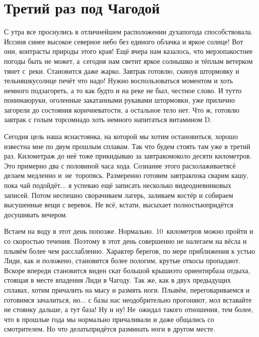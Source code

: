 \chapter{Третий раз под Чагодой} 
\vepsianrose

С утра все проснулись в отличнейшем расположении духа\mdash погода способствовала. Иссиня синее высокое северное небо без единого облачка и яркое солнце! Вот они, контрасты природы этого края! Ещё вчера нам казалось, что мерзопакостнее погоды быть не может, а~сегодня нам светит яркое солнышко и тёплым ветерком тянет с~реки. Становится даже жарко. Завтрак готовлю, скинув штормовку и тельняшку\mdash солнце печёт что надо! Нужно воспользоваться моментом и хоть немного подзагореть, а то как будто и на реке не был, честное слово. И тут\sdash то понимаю\mdash руки, оголенные закатанными рукавами штормовки, уже прилично загорели до состояния коричневатости, а остальное тело нет. Что ж, готовлю завтрак с голым торсом\mdash надо хоть немного напитаться витамином D.

Сегодня цель наша ясна\mdash стоянка, на которой мы хотим остановиться, хорошо известна мне по двум прошлым сплавам. Так что будем стоять там уже в третий раз. Километраж до неё тоже прикидываю за завтраком\mdash около десяти километров. Это примерно два с половиной часа хода. Сознание этого расхолаживает\mdash всё делаем медленно и~не~торопясь. Размеренно готовим завтрак\mdash пока сварим кашу, пока чай подойдёт$\ldots$ я успеваю ещё записать несколько видеодневниковых записей. Потом неспешно сворачиваем лагерь, заливаем костёр и собираем высушенные вещи с веревок. Не всё, кстати, высыхает полностью\mdash придётся досушивать вечером.

Встаем на воду в этот день попозже. Нормально. 10~километров можно пройти и со скоростью течения. Поэтому в этот день совершенно не налегаем на вёсла и плывём более чем расслабленно. Характер берегов, по мере приближения к устью Лиди, как и положено, становится более пологим, крутые откосы пропадают. Вскоре впереди становится виден скат большой крыши\mdash это ориентир\mdash база отдыха, стоящая в месте впадения Лиди в Чагоду. Так же, как в двух предыдущих сплавах, хотим причалить на мысу и размять ноги. Плывём, переговариваемся и готовимся зачалиться, но$\ldots$ с базы нас неодобрительно прогоняют, мол вставайте не стоянку дальше, а тут база! Ну и ну! Не~ожидал такого отношения, тем более, что в прошлые года мы нормально причаливали и даже общались со смотрителем. Но что делать\mdash придётся разминать ноги в другом месте. 

